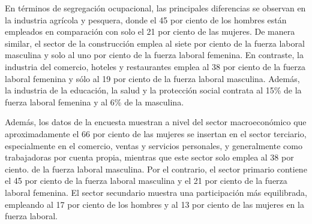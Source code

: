 En términos de segregación ocupacional, las principales diferencias se observan en la industria agrícola y pesquera, donde el 45 por ciento de los hombres están empleados en comparación con solo el 21 por ciento de las mujeres. De manera similar, el sector de la construcción emplea al siete por ciento de la fuerza laboral masculina y solo al uno por ciento de la fuerza laboral femenina. En contraste, la industria del comercio, hoteles y restaurantes emplea al 38 por ciento de la fuerza laboral femenina y sólo al 19 por ciento de la fuerza laboral masculina. Además, la industria de la educación, la salud y la protección social contrata al 15\% de la fuerza laboral femenina y al 6\% de la masculina.

Además, los datos de la encuesta muestran a nivel del sector macroeconómico que aproximadamente el 66 por ciento de las mujeres se insertan en el sector terciario, especialmente en el comercio, ventas y servicios personales, y generalmente como trabajadoras por cuenta propia, mientras que este sector solo emplea al 38 por ciento. de la fuerza laboral masculina. Por el contrario, el sector primario contiene el 45 por ciento de la fuerza laboral masculina y el 21 por ciento de la fuerza laboral femenina. El sector secundario muestra una participación más equilibrada, empleando al 17 por ciento de los hombres y al 13 por ciento de las mujeres en la fuerza laboral.
